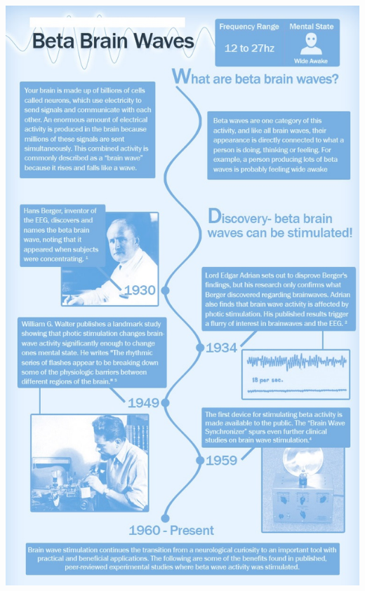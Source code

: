 \documentclass[10pt]{article}
\begin{document}
\begin{center}
	\graphicspath{ {images/} }
	\includegraphics[width=16cm, height=23cm]{Beta_wave}
\end{center}
\end{document}

